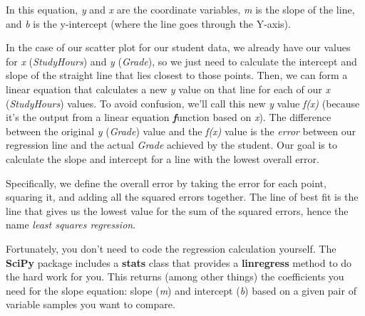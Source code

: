 \documentclass[11pt]{article}
\begin{document}
In this equation, \emph{y} and \emph{x} are the coordinate variables,
\emph{m} is the slope of the line, and \emph{b} is the y-intercept
(where the line goes through the Y-axis).

In the case of our scatter plot for our student data, we already have
our values for \emph{x} (\emph{StudyHours}) and \emph{y} (\emph{Grade}),
so we just need to calculate the intercept and slope of the straight
line that lies closest to those points. Then, we can form a linear
equation that calculates a new \emph{y} value on that line for each of
our \emph{x} (\emph{StudyHours}) values. To avoid confusion, we'll call
this new \emph{y} value \emph{f(x)} (because it's the output from a
linear equation \textbf{\emph{f}}unction based on \emph{x}). The
difference between the original \emph{y} (\emph{Grade}) value and the
\emph{f(x)} value is the \emph{error} between our regression line and
the actual \emph{Grade} achieved by the student. Our goal is to
calculate the slope and intercept for a line with the lowest overall
error.

Specifically, we define the overall error by taking the error for each
point, squaring it, and adding all the squared errors together. The line
of best fit is the line that gives us the lowest value for the sum of
the squared errors, hence the name \emph{least squares regression}.

Fortunately, you don't need to code the regression calculation yourself.
The \textbf{SciPy} package includes a \textbf{stats} class that provides
a \textbf{linregress} method to do the hard work for you. This returns
(among other things) the coefficients you need for the slope equation:
slope (\emph{m}) and intercept (\emph{b}) based on a given pair of
variable samples you want to compare.
\end{document}
